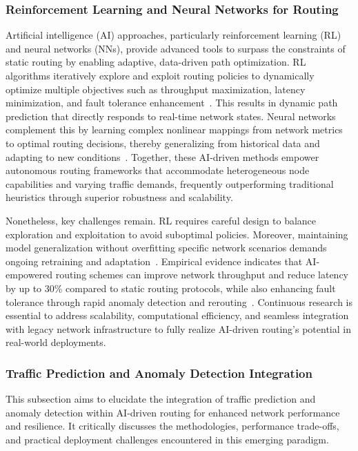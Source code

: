 \documentclass[sigconf]{acmart}
\begin{document}
\subsubsection{Reinforcement Learning and Neural Networks for Routing}

Artificial intelligence (AI) approaches, particularly reinforcement learning (RL) and neural networks (NNs), provide advanced tools to surpass the constraints of static routing by enabling adaptive, data-driven path optimization. RL algorithms iteratively explore and exploit routing policies to dynamically optimize multiple objectives such as throughput maximization, latency minimization, and fault tolerance enhancement~\cite{ref4}. This results in dynamic path prediction that directly responds to real-time network states. Neural networks complement this by learning complex nonlinear mappings from network metrics to optimal routing decisions, thereby generalizing from historical data and adapting to new conditions~\cite{ref17}\textemdash\cite{ref20}. Together, these AI-driven methods empower autonomous routing frameworks that accommodate heterogeneous node capabilities and varying traffic demands, frequently outperforming traditional heuristics through superior robustness and scalability.

Nonetheless, key challenges remain. RL requires careful design to balance exploration and exploitation to avoid suboptimal policies. Moreover, maintaining model generalization without overfitting specific network scenarios demands ongoing retraining and adaptation~\cite{ref53}. Empirical evidence indicates that AI-empowered routing schemes can improve network throughput and reduce latency by up to 30\% compared to static routing protocols, while also enhancing fault tolerance through rapid anomaly detection and rerouting~\cite{ref4}. Continuous research is essential to address scalability, computational efficiency, and seamless integration with legacy network infrastructure to fully realize AI-driven routing's potential in real-world deployments.

\subsubsection{Traffic Prediction and Anomaly Detection Integration}

This subsection aims to elucidate the integration of traffic prediction and anomaly detection within AI-driven routing for enhanced network performance and resilience. It critically discusses the methodologies, performance trade-offs, and practical deployment challenges encountered in this emerging paradigm.
\end{document}
